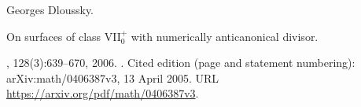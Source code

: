 Georges Dloussky.

\newblock On surfaces of class {VII}$_0^+$ with numerically anticanonical
  divisor.

, 128(3):639--670, 2006.
\newblock {}.
\newblock Cited edition (page and statement numbering): arXiv:math/0406387v3, 13 April 2005.
\newblock URL \url{https://arxiv.org/pdf/math/0406387v3}.

